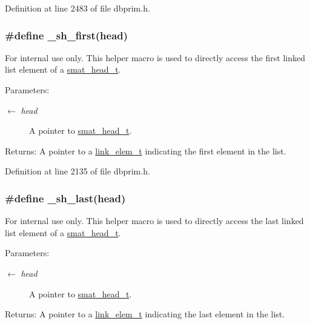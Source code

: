 Definition at line 2483 of file dbprim.h.\hypertarget{group__dbprim__smat_ga48}{
\subsubsection[\_\-sh\_\-first]{\setlength{\rightskip}{0pt plus 5cm}\#define \_\-sh\_\-first(head)}}
\label{group__dbprim__smat_ga48}


\begin{Desc}
\item[For internal use only.]
This helper macro is used to directly access the first linked list element of a \hyperlink{group__dbprim__smat_ga1}{smat\_\-head\_\-t}.

\begin{Desc}
\item[Parameters:]
\begin{description}
\item[\mbox{$\leftarrow$} {\em head}]A pointer to \hyperlink{group__dbprim__smat_ga1}{smat\_\-head\_\-t}.\end{description}
\end{Desc}
\begin{Desc}
\item[Returns:]A pointer to a \hyperlink{group__dbprim__link_ga1}{link\_\-elem\_\-t} indicating the first element in the list.\end{Desc}
\end{Desc}


Definition at line 2135 of file dbprim.h.\hypertarget{group__dbprim__smat_ga50}{
\subsubsection[\_\-sh\_\-last]{\setlength{\rightskip}{0pt plus 5cm}\#define \_\-sh\_\-last(head)}}
\label{group__dbprim__smat_ga50}


\begin{Desc}
\item[For internal use only.]
This helper macro is used to directly access the last linked list element of a \hyperlink{group__dbprim__smat_ga1}{smat\_\-head\_\-t}.

\begin{Desc}
\item[Parameters:]
\begin{description}
\item[\mbox{$\leftarrow$} {\em head}]A pointer to \hyperlink{group__dbprim__smat_ga1}{smat\_\-head\_\-t}.\end{description}
\end{Desc}
\begin{Desc}
\item[Returns:]A pointer to a \hyperlink{group__dbprim__link_ga1}{link\_\-elem\_\-t} indicating the last element in the list.\end{Desc}
\end{Desc}


